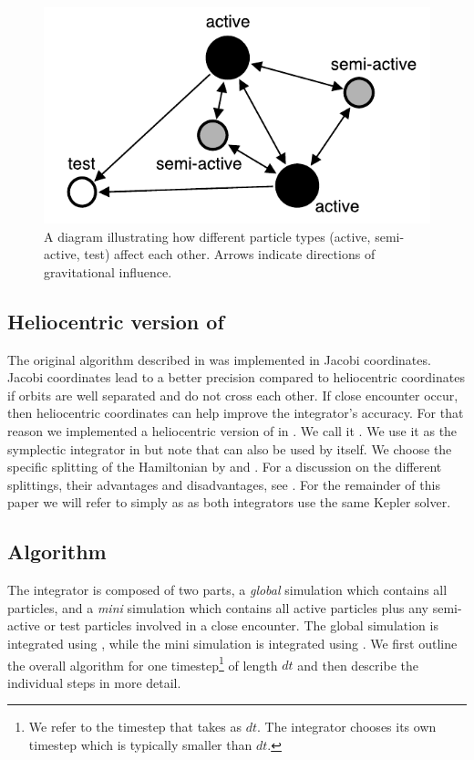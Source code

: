 \begin{figure}
\centerline{\includegraphics[scale=0.6]{chap4/images/bodies.pdf}}
\caption{A diagram illustrating how different particle types (active, semi-active, test) affect each other. Arrows indicate directions of gravitational influence.
 }
\label{fig:bodies}
\end{figure}

\subsection{Heliocentric version of \whfast}
The original \whfast algorithm described in  \cite{Rein2015b} was implemented in Jacobi coordinates.
Jacobi coordinates lead to a better precision compared to heliocentric coordinates if orbits are well separated and do not cross each other. 
If close encounter occur, then heliocentric coordinates can help improve the integrator's accuracy.
For that reason we implemented a heliocentric version of \whfast in \reb.
We call it \whfasthelio.
We use it as the symplectic integrator in \hermes but note that \whfasthelio can also be used by itself. 
We choose the specific splitting of the Hamiltonian by \cite{Duncan1998} and \cite{Chambers1999}.
For a discussion on the different splittings, their advantages and disadvantages, see \cite{Wisdom2006}. 
For the remainder of this paper we will refer to \whfasthelio simply as \whfast as both integrators use the same Kepler solver.

\subsection{Algorithm}
\label{sec:Alg}
The \hermes integrator is composed of two parts, a \textit{global} simulation which contains all particles, and a \textit{mini} simulation which contains all active particles plus any semi-active or test particles involved in a close encounter.
The global simulation is integrated using \whfast, while the mini simulation is integrated using \ias. 
We first outline the overall algorithm for one timestep\footnote{We refer to the timestep that \whfast takes as $dt$. The \ias integrator chooses its own timestep which is typically smaller than $dt$.}  of length $dt$ and then describe the individual steps in more detail.

